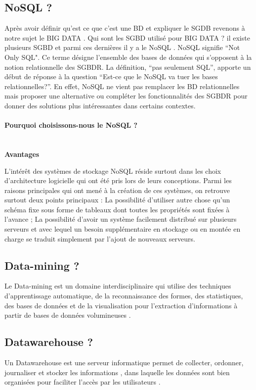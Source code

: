 \documentclass[11pt,twoside,openany,x11names,svgnames]{memoir}
\begin{document}
				\subsection{NoSQL ?}
				
				\normalsize Après avoir définir qu'est ce que c'est une BD et expliquer le SGDB revenons à notre sujet le BIG DATA .
			Qui sont les SGBD utilisé pour BIG DATA ?
								il existe plusieurs SGBD et parmi ces dernières il y a le NoSQL .
NoSQL signifie “Not Only SQL". Ce terme désigne l’ensemble des bases de données qui s’opposent à la notion relationnelle des SGBDR. La définition, “pas seulement SQL”, apporte un début de réponse à la question “Est-ce que le NoSQL va tuer les bases relationnelles?”. En effet, NoSQL ne vient pas remplacer les BD relationnelles mais proposer une alternative ou compléter les fonctionnalités des SGBDR pour donner des solutions plus intéressantes dans certains contextes.\paragraph{}
	\textbf{Pourquoi choisissons-nous le NoSQL ?}\paragraph{}
	\\
				\textbf{Avantages}

\normalsize L’intérêt des systèmes de stockage NoSQL réside surtout dans les choix d’architecture logicielle qui ont été pris lors de leurs conceptions. Parmi les raisons principales qui ont mené à la création de ces systèmes, on retrouve surtout deux points principaux :
La possibilité d’utiliser autre chose qu’un schéma fixe sous forme de tableaux dont toutes les propriétés sont fixées à l’avance ;
La possibilité d’avoir un système facilement distribué sur plusieurs serveurs et avec lequel un besoin supplémentaire en stockage ou en montée en charge se traduit simplement par l’ajout de nouveaux serveurs.
	
				
			\subsection{Data-mining ?}
			\normalsize Le Data-mining est un domaine interdisciplinaire qui utilise des techniques d’apprentissage automatique, de la reconnaissance des formes, des statistiques, des bases de données et de la visualisation pour l'extraction d'informations à partir de bases de données volumineuses .
				\subsection{Datawarehouse ?} 
				\normalsize Un Datawarehouse est une serveur informatique permet de collecter, ordonner, journaliser et stocker les informations , dans laquelle les données sont bien organisées pour faciliter l'accès par les utilisateurs . 
					
\end{document}
